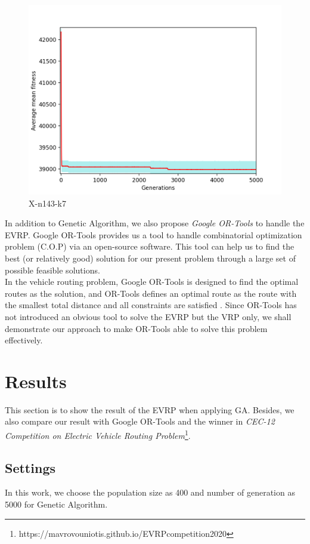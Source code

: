 \documentclass[conference,compsoc]{IEEEtran}
\begin{document}
\begin{figure}[h!]
    \centering
    \includegraphics[scale=0.35]{X-n143-k7-mean}
    \caption{X-n143-k7}
    \label{fig:my_label}
\end{figure}
\newpage

In addition to Genetic Algorithm, we also propose \textit{Google OR-Tools} \cite{ortools} to handle the EVRP. Google OR-Tools provides us a tool to handle combinatorial optimization problem (C.O.P) via an open-source software. This tool can help us to find the best (or relatively good) solution for our present problem through a large set of possible feasible solutions.\\


In the vehicle routing problem, Google OR-Tools is designed to find the optimal routes as the solution, and OR-Tools defines an optimal route as the route with the smallest total distance and all constraints are satisfied \cite{vrp_demonstration}. Since OR-Tools has not introduced an obvious tool to solve the EVRP but the VRP only, we shall demonstrate our approach to make OR-Tools able to solve this problem effectively.

\section{Results}
This section is to show the result of the EVRP when applying GA. Besides, we also compare our result with Google OR-Tools and the winner in \textit{CEC-12 Competition on Electric Vehicle Routing Problem}\footnote{https://mavrovouniotis.github.io/EVRPcompetition2020}.
\subsection*{Settings}
In this work, we choose the population size as 400 and number of generation as 5000 for Genetic Algorithm.\\
\end{document}
